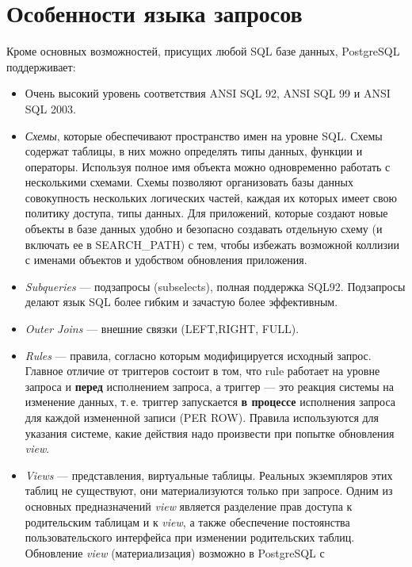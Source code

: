 \documentclass[a4paper,12pt,notitlepage,headsepline,pdftex]{scrartcl}
\begin{document}
\section{Особенности языка запросов}
  Кроме основных возможностей, присущих любой SQL базе данных, PostgreSQL
  поддерживает:\cite{cookbook}
  \begin{itemize}
    \item Очень высокий уровень соответствия ANSI SQL 92, ANSI SQL 99 и ANSI
      SQL 2003.
    \item \emph{Схемы}, которые обеспечивают пространство имен на уровне
      SQL.
      Схемы содержат таблицы, в них можно определять типы данных, функции и
      операторы.
      Используя полное имя объекта можно одновременно работать с несколькими
      схемами.
      Схемы позволяют организовать базы данных совокупность нескольких
      логических частей, каждая их которых имеет свою политику доступа, типы
      данных.
      Для приложений, которые создают новые объекты в базе данных удобно и
      безопасно создавать отдельную схему (и включать ее в SEARCH\_PATH) с
      тем, чтобы избежать возможной коллизии с именами объектов и удобством
      обновления приложения.
    \item \emph{Subqueries} --- подзапросы (subselects), полная поддержка
      SQL92.
      Подзапросы делают язык SQL более гибким и зачастую более эффективным.
    \item \emph{Outer Joins} --- внешние связки (LEFT,RIGHT, FULL).
    \item \emph{Rules} --- правила, согласно которым модифицируется исходный
      запрос.
      Главное отличие от триггеров состоит в том, что rule работает на
      уровне запроса и \textbf{перед} исполнением запроса, а триггер --- это
      реакция системы на изменение данных, т.\,е. триггер запускается
      \textbf{в процессе} исполнения запроса для каждой измененной записи
      (PER ROW).
      Правила используются для указания системе, какие действия надо
      произвести при попытке обновления \emph{view}.
    \item \emph{Views} --- представления, виртуальные таблицы.
      Реальных экземпляров этих таблиц не существуют, они материализуются
      только при запросе.
      Одним из основных предназначений \emph{view} является разделение прав
      доступа к родительским таблицам и к \emph{view}, а также обеспечение
      постоянства пользовательского интерфейса при изменении родительских
      таблиц.
      Обновление \emph{view} (материализация) возможно в PostgreSQL с

\end{itemize}
\end{document}
